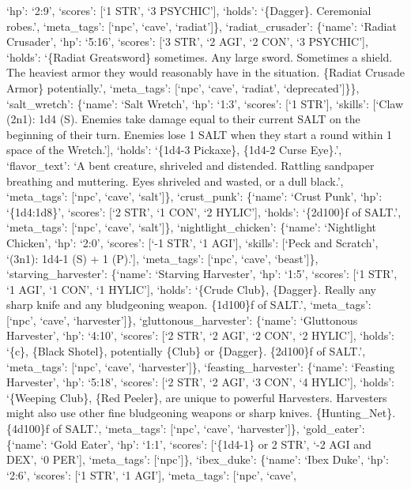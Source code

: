 \documentclass[
  letterpaper,
  DIV=11,
  numbers=noendperiod]{scrartcl}
\begin{document}
`hp': `2:9', `scores': {[}`1 STR', `3 PSYCHIC'{]}, `holds': `\{Dagger\}.
Ceremonial robes.', `meta\_tags': {[}`npc', `cave', `radiat'{]}\},
`radiat\_crusader': \{`name': `Radiat Crusader', `hp': `5:16', `scores':
{[}`3 STR', `2 AGI', `2 CON', `3 PSYCHIC'{]}, `holds': `\{Radiat
Greatsword\} sometimes. Any large sword. Sometimes a shield. The
heaviest armor they would reasonably have in the situation. \{Radiat
Crusade Armor\} potentially.', `meta\_tags': {[}`npc', `cave', `radiat',
`deprecated'{]}\}\}, `salt\_wretch': \{`name': `Salt Wretch', `hp':
`1:3', `scores': {[}`1 STR'{]}, `skills': {[}`Claw (2n1): 1d4 (S).
Enemies take damage equal to their current SALT on the beginning of
their turn. Enemies lose 1 SALT when they start a round within 1 space
of the Wretch.'{]}, `holds': `\{1d4-3 Pickaxe\}, \{1d4-2 Curse Eye\}.',
`flavor\_text': `A bent creature, shriveled and distended. Rattling
sandpaper breathing and muttering. Eyes shriveled and wasted, or a dull
black.', `meta\_tags': {[}`npc', `cave', `salt'{]}\}, `crust\_punk':
\{`name': `Crust Punk', `hp': `\{1d4:1d8\}', `scores': {[}`2 STR', `1
CON', `2 HYLIC'{]}, `holds': `\{2d100\}f of SALT.', `meta\_tags':
{[}`npc', `cave', `salt'{]}\}, `nightlight\_chicken': \{`name':
`Nightlight Chicken', `hp': `2:0', `scores': {[}`-1 STR', `1 AGI'{]},
`skills': {[}`Peck and Scratch', `(3n1): 1d4-1 (S) + 1 (P).'{]},
`meta\_tags': {[}`npc', `cave', `beast'{]}\}, `starving\_harvester':
\{`name': `Starving Harvester', `hp': `1:5', `scores': {[}`1 STR', `1
AGI', `1 CON', `1 HYLIC'{]}, `holds': `\{Crude Club\}, \{Dagger\}.
Really any sharp knife and any bludgeoning weapon. \{1d100\}f of SALT.',
`meta\_tags': {[}`npc', `cave', `harvester'{]}\},
`gluttonous\_harvester': \{`name': `Gluttonous Harvester', `hp': `4:10',
`scores': {[}`2 STR', `2 AGI', `2 CON', `2 HYLIC'{]}, `holds': `\{c\},
\{Black Shotel\}, potentially \{Club\} or \{Dagger\}. \{2d100\}f of
SALT.', `meta\_tags': {[}`npc', `cave', `harvester'{]}\},
`feasting\_harvester': \{`name': `Feasting Harvester', `hp': `5:18',
`scores': {[}`2 STR', `2 AGI', `3 CON', `4 HYLIC'{]}, `holds':
`\{Weeping Club\}, \{Red Peeler\}, are unique to powerful Harvesters.
Harvesters might also use other fine bludgeoning weapons or sharp
knives. \{Hunting\_Net\}. \{4d100\}f of SALT.', `meta\_tags': {[}`npc',
`cave', `harvester'{]}\}, `gold\_eater': \{`name': `Gold Eater', `hp':
`1:1', `scores': {[}`\{1d4-1\} or 2 STR', `-2 AGI and DEX', `0 PER'{]},
`meta\_tags': {[}`npc'{]}\}, `ibex\_duke': \{`name': `Ibex Duke', `hp':
`2:6', `scores': {[}`1 STR', `1 AGI'{]}, `meta\_tags': {[}`npc', `cave',
\end{document}
